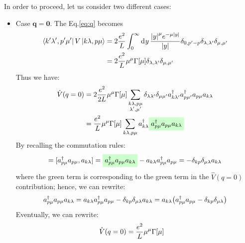 \documentclass[11pt, a4paper, twoside, openright]{article}
\begin{document}
\begin{itemize}
\begin{equation}
   \label{eq:q}
\end{equation}
In order to proceed, let us consider two different cases:
\begin{itemize}
\item Case \( \mathbf{q=0} \).
The Eq.\eqref{eq:q} becomes
\begin{equation*}
  \begin{split}
\bra{k'\lambda', p' \mu'} V \ket{k \lambda , p \mu } &= 2 \frac{e^2}{L} \int_{0 }^{\infty } \dd[]{y}  \frac{\abs{y} ^\mu e^{- \mu \abs{y} } }{\abs{y} } \delta _{0,p'-p}  \delta _{\lambda , \lambda'} \delta _{\mu , \mu'} \\
&= 2 \frac{e^2}{L}  \mu ^\mu \Gamma [\mu ]  \delta _{\lambda , \lambda'} \delta _{\mu , \mu'}
  \end{split}
\end{equation*}
Thus we have:
\begin{equation*}
  \begin{split}
  \hat{V} (q=0 )&= 2 \frac{e^2}{2L} \mu ^\mu \Gamma [\mu ] \sum_{\substack{k \lambda, p\mu \\ \lambda' , \mu'  } }^{}
 \delta _{\lambda \lambda'} \delta _{\mu \mu'}
  a_{k\lambda'} ^\dag a_{p\mu'} ^\dag a_{p \mu} a_{k \lambda } \\
  &= \frac{e^2}{L} \mu ^\mu \Gamma [\mu ] \sum_{\substack{k \lambda, p\mu } }^{}
  a_{k\lambda} ^\dag \mathcolorbox{green!20}{a_{p\mu} ^\dag a_{p \mu} a_{k \lambda } }
\end{split}
\end{equation*}
By recalling the commutation rules:
\begin{equation*}
[\hat{n}_{p \mu }, a_{k \lambda } ] =
[a_{p \mu } ^\dag a_{p \mu }, a_{k \lambda } ]
= \mathcolorbox{green!20}{a_{p \mu }^\dag a_{p \mu } a_{k\lambda }} - a_{k \lambda } a_{p \mu }^\dag a_{p \mu }
= - \delta _{k p} \delta _{\mu \lambda } a_{k \lambda }
\end{equation*}
where the green term is corresponding to the green term in the \( \hat{V} (q=0)  \) contribution; hence, we can rewrite:
\begin{equation*}
 a_{p \mu } ^\dag a_{p \mu } a_{k \lambda }
 = a_{k \lambda } a_{p \mu } ^\dag a_{p \mu }
 - \delta _{k p} \delta _{\mu \lambda } a_{k \lambda }
 = a_{k\lambda } \qty(  a_{p \mu } ^\dag a_{p \mu } - \delta _{k p} \delta _{\mu \lambda } )
\end{equation*}
Eventually, we can rewrite:
\begin{equation*}
\begin{split}
  \hat{V} \qty(q = 0) &= \frac{e^2}{L}\mu ^\mu \Gamma [\mu ]

\end{split}
\end{equation*}
\end{itemize}
\end{itemize}
\end{document}
